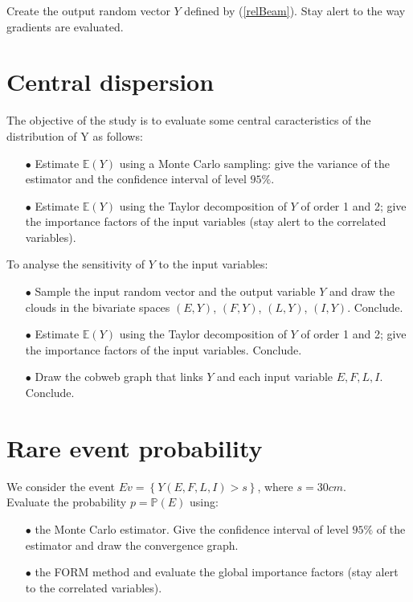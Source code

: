 \documentclass[11pt, french, A4wide]{article}
\theoremstyle{remark}
\theoremstyle{definition}
\begin{document}
Create the output random vector $Y$ defined by (\ref{relBeam}). Stay alert to the way gradients are evaluated.


\section{Central dispersion}

The objective of the study is to evaluate some central caracteristics of the distribution of Y as follows:
\begin{itemize}
 \item[$\bullet$] Estimate $\mathbb{E}(Y)$ using a Monte Carlo sampling: give the variance of the estimator and the confidence interval of level $95 \%$.
 \item[$\bullet$] Estimate $\mathbb{E}(Y)$ using the Taylor decomposition of $Y$ of order 1 and 2; give the importance factors of the input variables (stay alert to the correlated variables).
\end{itemize}
\vspace*{0.2cm}

To analyse the sensitivity of $Y$ to the input variables:
 \begin{itemize}
 \item[$\bullet$] Sample the input random vector and the output variable $Y$ and draw the clouds in the bivariate spaces  $(E,Y)$, $(F,Y)$, $(L,Y)$, $(I,Y)$.  Conclude.
 \item[$\bullet$] Estimate $\mathbb{E}(Y)$ using the Taylor decomposition of $Y$ of order 1 and 2; give the importance factors of the input variables.  Conclude.
 \item[$\bullet$] Draw the cobweb graph that links $Y$ and each input variable $E, F, L, I$. Conclude.
 \end{itemize}

\newpage
\section{Rare event probability}

We consider the event $Ev = \left\{Y(E,F,L,I) > s \right\}$, where $s = 30cm$.\\

Evaluate the probability $p=\mathbb{P}(E)$ using:
 \begin{itemize}
 \item[$\bullet$] the Monte Carlo estimator. Give the  confidence interval of level $95 \%$ of the estimator and draw the convergence graph.
 \item[$\bullet$] the FORM method and evaluate the global importance factors (stay alert to the correlated variables).
 \end{itemize}
\end{document}
